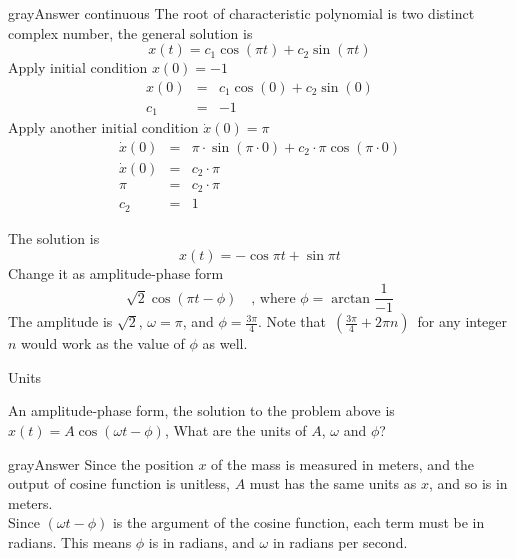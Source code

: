 \begin{mybox}{gray}{Answer continuous}
  The root of characteristic polynomial is two distinct complex number,
  the general solution is
  \begin{equation*}
    x(t) = c_1 \cos (\pi t) + c_2 \sin (\pi t) 
  \end{equation*}
  Apply initial condition $x(0) = -1$
  \begin{eqnarray*}
    x(0) &=& c_1 \cos (0) + c_2 \sin (0) \\
    c_1  &=& -1
  \end{eqnarray*}
  Apply another initial condition $\dot{x}(0) = \pi $
  \begin{eqnarray*}
    \dot{x}(0) &=& \pi \cdot \sin(\pi \cdot 0) + c_2 \cdot \pi \cos(\pi \cdot 0) \\
    \dot{x}(0) &=&  c_2 \cdot \pi  \\
    \pi &=& c_2 \cdot \pi \\
    c_2  &=& 1
  \end{eqnarray*}

  The solution is
  \begin{equation*}
    x(t) = -\cos \pi t + \sin \pi t
  \end{equation*}
  Change it as amplitude-phase form
  \begin{equation*}
    \displaystyle \sqrt{2} \cos(\pi t - \phi) 
    \quad \text{, where } \phi = \arctan \frac{1}{-1}
  \end{equation*}
  The amplitude is $\sqrt{2}$, $\omega = \pi$, and $\phi = \frac{3 \pi}{4}$.
  Note that $\, \displaystyle \left(\frac{3\pi }{4}+2\pi n\right)\,$
  for any integer $n$ would work as the value of $\phi$ as well.
\end{mybox}

\begin{exercise}
 Units 
\end{exercise}
An amplitude-phase form, the solution to the problem above is
$x(t) = A \cos ⁡(\omega t - \phi)$, What are the units of
$A$, $\omega$ and $\phi$?
\begin{mybox}{gray}{Answer}
  Since the position $x$ of the mass is measured in meters,
  and the output of cosine function is unitless, $A$ must has the same units as $x$, and so is in meters.\\
  Since $(\omega t - \phi)$ is the argument of the cosine function,
  each term must be in radians. This means $\phi$ is in radians, and $\omega$ in radians per second.  
\end{mybox}
\clearpage

